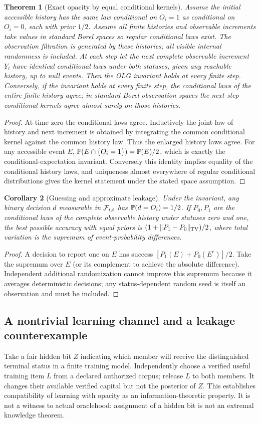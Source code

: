 \documentclass[11pt]{article}
\newtheorem{theorem}{Theorem}[section]\newtheorem{proposition}[theorem]{Proposition}\newtheorem{lemma}[theorem]{Lemma}\newtheorem{corollary}[theorem]{Corollary}
\theoremstyle{definition}\newtheorem{definition}[theorem]{Definition}\newtheorem{conjecture}[theorem]{Conjecture}\newtheorem{example}[theorem]{Example}
\begin{document}
\begin{theorem}[Exact opacity by equal conditional kernels]
Assume the initial accessible history has the same law conditional on $O_i=1$ as conditional on $O_i=0$, each with prior $1/2$. Assume all finite histories and observable increments take values in standard Borel spaces so regular conditional laws exist. The observation filtration is generated by these histories; all visible internal randomness is included. At each step let the next complete observable increment $Y_t$ have identical conditional laws under both statuses, given any reachable history, up to null events. Then the OLG invariant holds at every finite step. Conversely, if the invariant holds at every finite step, the conditional laws of the entire finite history agree; in standard Borel observation spaces the next-step conditional kernels agree almost surely on those histories.
\end{theorem}
\begin{proof}At time zero the conditional laws agree. Inductively the joint law of history and next increment is obtained by integrating the common conditional kernel against the common history law. Thus the enlarged history laws agree. For any accessible event $E$, $\mathbb P(E\cap\{O_i=1\})=\mathbb P(E)/2$, which is exactly the conditional-expectation invariant. Conversely this identity implies equality of the conditional history laws, and uniqueness almost everywhere of regular conditional distributions gives the kernel statement under the stated space assumption.\end{proof}
\begin{corollary}[Guessing and approximate leakage]
Under the invariant, any binary decision $d$ measurable in $\mathcal F_{i,t}$ has $\mathbb P(d=O_i)=1/2$. If $P_0,P_1$ are the conditional laws of the complete observable history under statuses zero and one, the best possible accuracy with equal priors is $(1+\|P_1-P_0\|_{\rm TV})/2$, where total variation is the supremum of event-probability differences.
\end{corollary}
\begin{proof}A decision to report one on $E$ has success $[P_1(E)+P_0(E^c)]/2$. Take the supremum over $E$ (or its complement to achieve the absolute difference). Independent additional randomization cannot improve this supremum because it averages deterministic decisions; any status-dependent random seed is itself an observation and must be included.\end{proof}

\subsection{A nontrivial learning channel and a leakage counterexample}
Take a fair hidden bit $Z$ indicating which member will receive the distinguished terminal status in a finite training model. Independently choose a verified useful training item $L$ from a declared authorized corpus; release $L$ to both members. It changes their available verified capital but not the posterior of $Z$. This establishes compatibility of learning with opacity as an information-theoretic property. It is not a witness to actual oraclehood: assignment of a hidden bit is not an extremal knowledge theorem.
\end{document}
